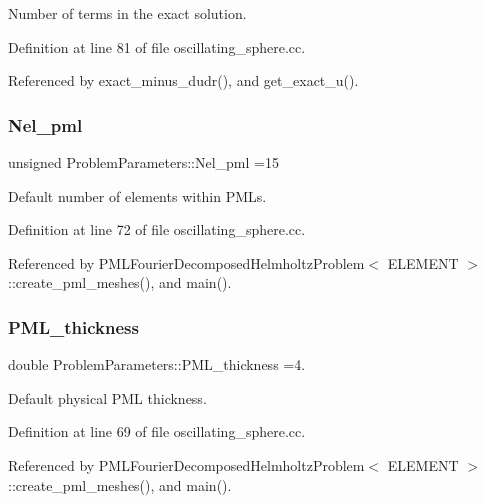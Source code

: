 Number of terms in the exact solution. 



Definition at line 81 of file oscillating\+\_\+sphere.\+cc.



Referenced by exact\+\_\+minus\+\_\+dudr(), and get\+\_\+exact\+\_\+u().

\mbox{\label{namespaceProblemParameters_aef2e7cb819b8c5012a0f2db03892ee87}} 
\subsubsection{\texorpdfstring{Nel\+\_\+pml}{Nel\_pml}}
{\footnotesize\ttfamily unsigned Problem\+Parameters\+::\+Nel\+\_\+pml =15}



Default number of elements within P\+M\+Ls. 



Definition at line 72 of file oscillating\+\_\+sphere.\+cc.



Referenced by P\+M\+L\+Fourier\+Decomposed\+Helmholtz\+Problem$<$ E\+L\+E\+M\+E\+N\+T $>$\+::create\+\_\+pml\+\_\+meshes(), and main().

\mbox{\label{namespaceProblemParameters_ad56d4d5946cbe68de28413e4f8aa4d42}} 
\subsubsection{\texorpdfstring{P\+M\+L\+\_\+thickness}{PML\_thickness}}
{\footnotesize\ttfamily double Problem\+Parameters\+::\+P\+M\+L\+\_\+thickness =4.}



Default physical P\+ML thickness. 



Definition at line 69 of file oscillating\+\_\+sphere.\+cc.



Referenced by P\+M\+L\+Fourier\+Decomposed\+Helmholtz\+Problem$<$ E\+L\+E\+M\+E\+N\+T $>$\+::create\+\_\+pml\+\_\+meshes(), and main().


